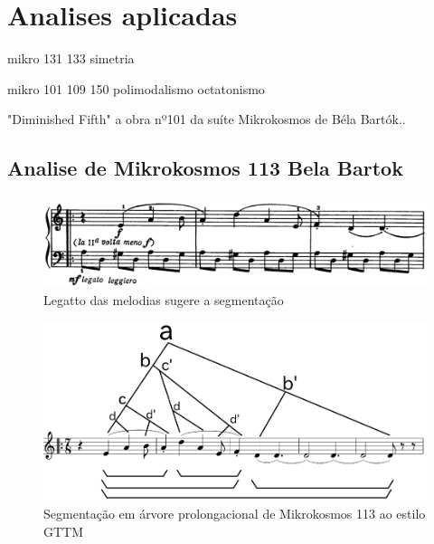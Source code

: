 \documentclass[
	12pt,				%
	openright,			%
	twoside,			%
	a4paper,			%
	english,			%
	french,				%
	spanish,			%
	brazil				%
	]{abntex2}
\begin{document}
\chapter{Analises aplicadas}
\label{experimetosanalises}

mikro 131 133 simetria
\cite[pgs.198-200]{antokoletz1984music}

mikro 101 109 150 polimodalismo octatonismo 
\cite[pgs.250-254]{antokoletz1984music}



"Diminished Fifth" a obra nº101 da suíte Mikrokosmos de Béla Bartók.\cite[pgs.112,116-117,135-136]{lester1989analytic}.








\section{Analise de Mikrokosmos 113 Bela Bartok}

\begin{figure}[htb]
	\caption{\label{fig_grafico}Legatto das melodias sugere a segmentação}
	\begin{center}
	    \includegraphics[scale=0.35]{mikro/mikro113-intro.png}
	\end{center}
\end{figure}

\begin{figure}[htb]
	\caption{\label{fig_grafico}Segmentação em árvore prolongacional de Mikrokosmos 113 ao estilo GTTM}
	\begin{center}
	    \includegraphics[scale=0.45]{mikro/mikro113_GTTM_tree.png}
	\end{center}
\end{figure}
\end{document}
